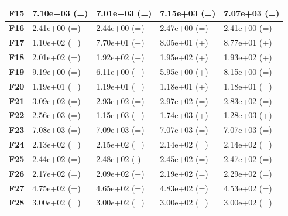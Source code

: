 \documentclass[12pt,a4paper]{report}
\begin{document}
{{{{{{{\begin{table}[h]
\begin{tabular}{|l|l|l|l|l|}
{\bf F15} & 7.10e+03 (=)        & 7.01e+03 (=)       & 7.15e+03 (=)      & 7.07e+03 (=)      \\ \hline
{\bf F16} & 2.41e+00 (=)        & 2.44e+00 (=)       & 2.47e+00 (=)      & 2.41e+00 (=)      \\ \hline
{\bf F17} & 1.10e+02 (=)        & 7.70e+01 (+)       & 8.05e+01 (+)      & 8.77e+01 (+)      \\ \hline
{\bf F18} & 2.01e+02 (=)        & 1.92e+02 (+)       & 1.95e+02 (+)      & 1.93e+02 (+)      \\ \hline
{\bf F19} & 9.19e+00 (=)        & 6.11e+00 (+)       & 5.95e+00 (+)      & 8.15e+00 (=)      \\ \hline
{\bf F20} & 1.19e+01 (=)        & 1.19e+01 (=)       & 1.18e+01 (+)      & 1.18e+01 (=)      \\ \hline
{\bf F21} & 3.09e+02 (=)        & 2.93e+02 (=)       & 2.97e+02 (=)      & 2.83e+02 (=)      \\ \hline
{\bf F22} & 2.56e+03 (=)        & 1.15e+03 (+)       & 1.74e+03 (+)      & 1.28e+03 (+)      \\ \hline
{\bf F23} & 7.08e+03 (=)        & 7.09e+03 (=)       & 7.07e+03 (=)      & 7.07e+03 (=)      \\ \hline
{\bf F24} & 2.13e+02 (=)        & 2.15e+02 (=)       & 2.14e+02 (=)      & 2.14e+02 (=)      \\ \hline
{\bf F25} & 2.44e+02 (=)        & 2.48e+02 (-)       & 2.45e+02 (=)      & 2.47e+02 (=)      \\ \hline
{\bf F26} & 2.17e+02 (=)        & 2.09e+02 (+)       & 2.19e+02 (=)      & 2.29e+02 (=)      \\ \hline
{\bf F27} & 4.75e+02 (=)        & 4.65e+02 (=)       & 4.83e+02 (=)      & 4.53e+02 (=)      \\ \hline
{\bf F28} & 3.00e+02 (=)        & 3.00e+02 (=)       & 3.00e+02 (=)      & 3.00e+02 (=)      \\ \hline
\end{tabular}
\end{table}

}}}}}}}
\end{document}
